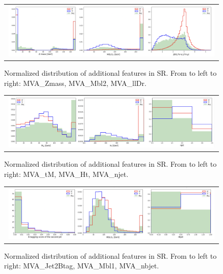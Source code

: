\begin{figure}[tbh!]
 \begin{center}
 \begin{tabular}{c}
  \includegraphics[width=0.99\textwidth]{figures/Part3/BDT/Features3}\\
 \end{tabular}
 \caption{Normalized distribution of additional features in SR. From to left to right: MVA\_Zmass, MVA\_Mbl2, MVA\_llDr.}
 \label{fig:Features3}
 \end{center}
\end{figure}

\begin{figure}[tbh!]
 \begin{center}
 \begin{tabular}{c}
  \includegraphics[width=0.99\textwidth]{figures/Part3/BDT/Features4}\\
 \end{tabular}
 \caption{Normalized distribution of additional features in SR. From to left to right: MVA\_tM, MVA\_Ht, MVA\_njet.}
 \label{fig:Features4}
 \end{center}
\end{figure}

\begin{figure}[tbh!]
 \begin{center}
 \begin{tabular}{c}
  \includegraphics[width=0.99\textwidth]{figures/Part3/BDT/Features5}\\
 \end{tabular}
 \caption{Normalized distribution of additional features in SR. From to left to right: MVA\_Jet2Btag, MVA\_Mbl1, MVA\_nbjet.}
 \label{fig:Features5}
 \end{center}
\end{figure}

